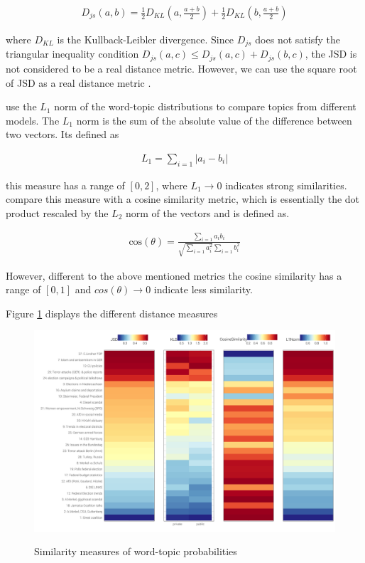 \documentclass[12pt,a4paper,notitlepage]{article}
\begin{document}
\begin{align*}
	D_{js}(a,b)=\frac{1}{2}D_{KL}(a,\frac{a+b}{2})+\frac{1}{2}D_{KL}(b,\frac{a+b}{2})
\end{align*}

where $D_{KL}$ is the Kullback-Leibler divergence. Since $D_{js}$ does not satisfy the triangular inequality condition $D_{js}(a,c)\leq D_{js}(a,c)+D_{js}(b,c)$, the JSD is not considered to be a real distance metric. However, we can use the square root of JSD as a real distance metric \citep{endres_new_2003}.

\citet{roberts_navigating_2016} use the $L_1$ norm of the word-topic distributions to compare topics from different models. The $L_1$ norm is the sum of the absolute value of the difference between two vectors. Its defined as

\begin{align*}
	L_1=\sum_{i=1} |a_i-b_i|
\end{align*}

this measure has a range of $[0,2]$, where $ L_1 \to 0$ indicates strong similarities. \citet{roberts_navigating_2016} compare this measure with a cosine similarity metric, which is essentially the dot product rescaled by the $L_2$ norm of the vectors and is defined as.

\begin{align*}
	\text{cos}(\theta)=\frac{\sum_{i=1}a_i b_i}{\sqrt{\sum_{i=1}a_i^2}\sum_{i=1}b_i^2}
\end{align*}

However, different to the above mentioned metrics the cosine similarity has a range of $[0,1]$ and $cos(\theta) \to 0$ indicate less similarity.

Figure \ref{fig_distance} displays the different distance measures 

\begin{figure}[H]
	\begin{center}
		\caption{Similarity measures of word-topic probabilities}
		\includegraphics[width=\textwidth,keepaspectratio]{../figs/distance}
		\label{fig_distance}
	\end{center}
\end{figure}
\end{document}
